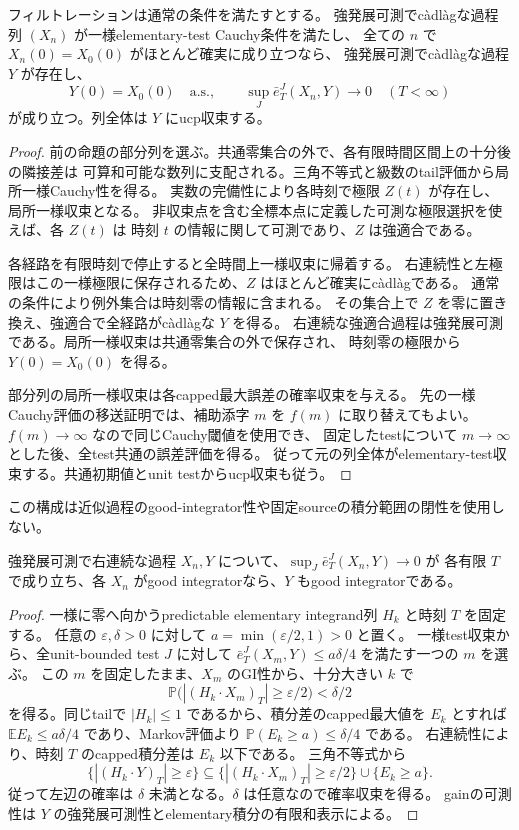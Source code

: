 \begin{proposition}
フィルトレーションは通常の条件を満たすとする。
強発展可測でcàdlàgな過程列 $(X_n)$ が一様elementary-test Cauchy条件を満たし、
全ての $n$ で $X_n(0)=X_0(0)$ がほとんど確実に成り立つなら、
強発展可測でcàdlàgな過程 $Y$ が存在し、
\[
 Y(0)=X_0(0)\quad\text{a.s.},\qquad
 \sup_J \bar e_T^J(X_n,Y)\longrightarrow0\quad(T<\infty)
\]
が成り立つ。列全体は $Y$ にucp収束する。
\end{proposition}
\begin{proof}
前の命題の部分列を選ぶ。共通零集合の外で、各有限時間区間上の十分後の隣接差は
可算和可能な数列に支配される。三角不等式と級数のtail評価から局所一様Cauchy性を得る。
実数の完備性により各時刻で極限 $Z(t)$ が存在し、局所一様収束となる。
非収束点を含む全標本点に定義した可測な極限選択を使えば、各 $Z(t)$ は
時刻 $t$ の情報に関して可測であり、$Z$ は強適合である。

各経路を有限時刻で停止すると全時間上一様収束に帰着する。
右連続性と左極限はこの一様極限に保存されるため、$Z$ はほとんど確実にcàdlàgである。
通常の条件により例外集合は時刻零の情報に含まれる。
その集合上で $Z$ を零に置き換え、強適合で全経路がcàdlàgな $Y$ を得る。
右連続な強適合過程は強発展可測である。局所一様収束は共通零集合の外で保存され、
時刻零の極限から $Y(0)=X_0(0)$ を得る。

部分列の局所一様収束は各capped最大誤差の確率収束を与える。
先の一様Cauchy評価の移送証明では、補助添字 $m$ を $f(m)$ に取り替えてもよい。
$f(m)\to\infty$ なので同じCauchy閾値を使用でき、
固定したtestについて $m\to\infty$ とした後、全test共通の誤差評価を得る。
従って元の列全体がelementary-test収束する。共通初期値とunit testからucp収束も従う。
\end{proof}
この構成は近似過程のgood-integrator性や固定sourceの積分範囲の閉性を使用しない。

\begin{proposition}\label{prop:gi-limit}
強発展可測で右連続な過程 $X_n,Y$ について、$\sup_J \bar e_T^J(X_n,Y)\to0$ が
各有限 $T$ で成り立ち、各 $X_n$ がgood integratorなら、$Y$ もgood integratorである。
\end{proposition}
\begin{proof}
一様に零へ向かうpredictable elementary integrand列 $H_k$ と時刻 $T$ を固定する。
任意の $\varepsilon,\delta>0$ に対して $a=\min(\varepsilon/2,1)>0$ と置く。
一様test収束から、全unit-bounded test $J$ に対して
$\bar e_T^J(X_m,Y)\le a\delta/4$ を満たす一つの $m$ を選ぶ。
この $m$ を固定したまま、$X_m$ のGI性から、十分大きい $k$ で
\[
 \mathbb P\bigl(|(H_k\cdot X_m)_T|\ge\varepsilon/2\bigr)<\delta/2
\]
を得る。同じtailで $|H_k|\le1$ であるから、積分差のcapped最大値を $E_k$ とすれば
$\mathbb E E_k\le a\delta/4$ であり、Markov評価より
$\mathbb P(E_k\ge a)\le\delta/4$ である。
右連続性により、時刻 $T$ のcapped積分差は $E_k$ 以下である。
三角不等式から
\[
 \{|(H_k\cdot Y)_T|\ge\varepsilon\}
 \subseteq \{|(H_k\cdot X_m)_T|\ge\varepsilon/2\}\cup\{E_k\ge a\}.
\]
従って左辺の確率は $\delta$ 未満となる。$\delta$ は任意なので確率収束を得る。
gainの可測性は $Y$ の強発展可測性とelementary積分の有限和表示による。
\end{proof}

